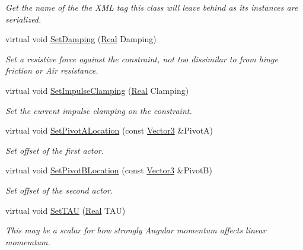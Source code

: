 \begin{DoxyCompactItemize}
\begin{DoxyCompactList}\small\item\em Get the name of the the XML tag this class will leave behind as its instances are serialized. \item\end{DoxyCompactList}\item 
virtual void \hyperlink{classphys_1_1Point2PointConstraint_a4699d58e8ec97e5eafa12508e89fa878}{SetDamping} (\hyperlink{namespacephys_af7eb897198d265b8e868f45240230d5f}{Real} Damping)
\begin{DoxyCompactList}\small\item\em Set a resistive force against the constraint, not too dissimilar to from hinge friction or Air resistance. \item\end{DoxyCompactList}\item 
virtual void \hyperlink{classphys_1_1Point2PointConstraint_afd2be426f4a13b9512d964903a035551}{SetImpulseClamping} (\hyperlink{namespacephys_af7eb897198d265b8e868f45240230d5f}{Real} Clamping)
\begin{DoxyCompactList}\small\item\em Set the current impulse clamping on the constraint. \item\end{DoxyCompactList}\item 
virtual void \hyperlink{classphys_1_1Point2PointConstraint_ad1ffe9d877dd0601f76215bec56c1a4a}{SetPivotALocation} (const \hyperlink{classphys_1_1Vector3}{Vector3} \&PivotA)
\begin{DoxyCompactList}\small\item\em Set offset of the first actor. \item\end{DoxyCompactList}\item 
virtual void \hyperlink{classphys_1_1Point2PointConstraint_abb11fffed7284323321be9ff481268a4}{SetPivotBLocation} (const \hyperlink{classphys_1_1Vector3}{Vector3} \&PivotB)
\begin{DoxyCompactList}\small\item\em Set offset of the second actor. \item\end{DoxyCompactList}\item 
virtual void \hyperlink{classphys_1_1Point2PointConstraint_a556c4610b62c075efaa9d246cf3d2dc2}{SetTAU} (\hyperlink{namespacephys_af7eb897198d265b8e868f45240230d5f}{Real} TAU)
\begin{DoxyCompactList}\small\item\em This may be a scalar for how strongly Angular momentum affects linear momemtum. \item\end{DoxyCompactList}\item 

\end{DoxyCompactItemize}

